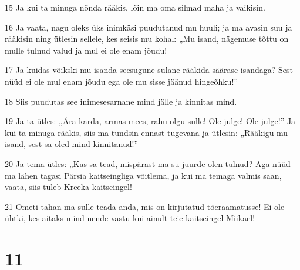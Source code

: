 \par 15 Ja kui ta minuga nõnda rääkis, lõin ma oma silmad maha ja vaikisin.
\par 16 Ja vaata, nagu oleks üks inimkäsi puudutanud mu huuli; ja ma avasin suu ja rääkisin ning ütlesin sellele, kes seisis mu kohal: „Mu isand, nägemuse tõttu on mulle tulnud valud ja mul ei ole enam jõudu!
\par 17 Ja kuidas võikski mu isanda seesugune sulane rääkida säärase isandaga? Sest nüüd ei ole mul enam jõudu ega ole mu sisse jäänud hingeõhku!”
\par 18 Siis puudutas see inimesesarnane mind jälle ja kinnitas mind.
\par 19 Ja ta ütles: „Ära karda, armas mees, rahu olgu sulle! Ole julge! Ole julge!” Ja kui ta minuga rääkis, siis ma tundsin ennast tugevana ja ütlesin: „Rääkigu mu isand, sest sa oled mind kinnitanud!”
\par 20 Ja tema ütles: „Kas sa tead, mispärast ma su juurde olen tulnud? Aga nüüd ma lähen tagasi Pärsia kaitseingliga võitlema, ja kui ma temaga valmis saan, vaata, siis tuleb Kreeka kaitseingel!
\par 21 Ometi tahan ma sulle teada anda, mis on kirjutatud tõeraamatusse! Ei ole ühtki, kes aitaks mind nende vastu kui ainult teie kaitseingel Miikael!

\chapter{11}

